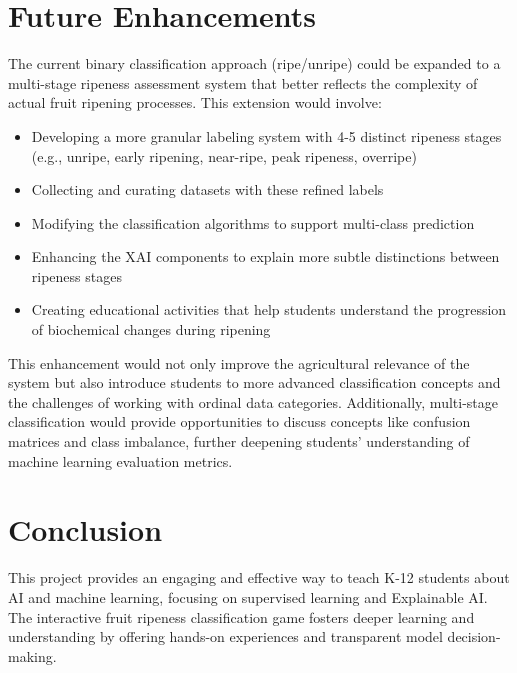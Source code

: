 \documentclass[conference]{IEEEtran}
\begin{document}
\section{Future Enhancements}
The current binary classification approach (ripe/unripe) could be expanded to a multi-stage ripeness assessment system that better reflects the complexity of actual fruit ripening processes. This extension would involve:

\begin{itemize}
    \item Developing a more granular labeling system with 4-5 distinct ripeness stages (e.g., unripe, early ripening, near-ripe, peak ripeness, overripe)
    \item Collecting and curating datasets with these refined labels
    \item Modifying the classification algorithms to support multi-class prediction
    \item Enhancing the XAI components to explain more subtle distinctions between ripeness stages
    \item Creating educational activities that help students understand the progression of biochemical changes during ripening
\end{itemize}

This enhancement would not only improve the agricultural relevance of the system but also introduce students to more advanced classification concepts and the challenges of working with ordinal data categories. Additionally, multi-stage classification would provide opportunities to discuss concepts like confusion matrices and class imbalance, further deepening students' understanding of machine learning evaluation metrics.


\section{Conclusion}
This project provides an engaging and effective way to teach K-12 students about AI and machine learning, focusing on supervised learning and Explainable AI. The interactive fruit ripeness classification game fosters deeper learning and understanding by offering hands-on experiences and transparent model decision-making.



\end{document}
